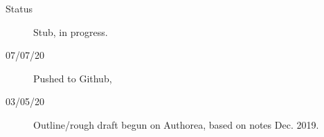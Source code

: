 \begin{description}
\item [{Status}] Stub, in progress.
\item [{07/07/20}] Pushed to Github, \href{}{}
\item [{03/05/20}] Outline/rough draft begun on Authorea, based on notes Dec. 2019.
\end{description}